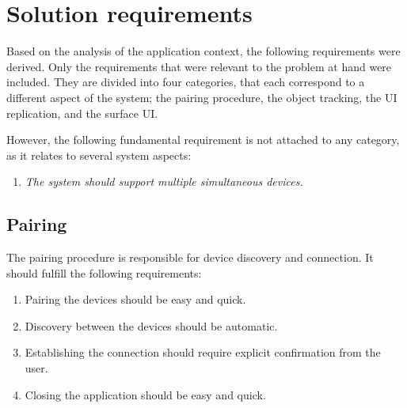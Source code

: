 \section{Solution requirements}
\label{sec:requirements}

Based on the analysis of the application context, the following requirements were derived.
Only the requirements that were relevant to the problem at hand were included.
They are divided into four categories, that each correspond to a different aspect of the system; the pairing procedure, the object tracking, the UI replication, and the surface UI.

However, the following fundamental requirement is not attached to any category, as it relates to several system aspects:
\begin{enumerate}[{R}-1]
\item \emph{The system should support multiple simultaneous devices.}
\end{enumerate}

\subsection{Pairing}

The pairing procedure is responsible for device discovery and connection.
It should fulfill the following requirements:

\label{RA}
\begin{enumerate}[{RA}-1]
\item Pairing the devices should be easy and quick.
\item Discovery between the devices should be automatic.
\item Establishing the connection should require explicit confirmation from the user.
\item Closing the application should be easy and quick.
\end{enumerate}


